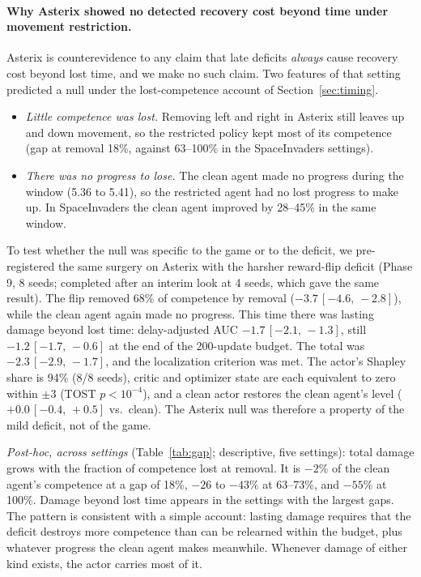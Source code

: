 \documentclass[10pt]{article} %
\newcommand{\ci}[2]{\,[#1,\,#2]}
\begin{document}
\paragraph{Why Asterix showed no detected recovery cost beyond time under movement restriction.}
Asterix is counterevidence to any claim that late deficits \emph{always} cause recovery cost beyond lost time, and we make no such claim. Two features of that setting predicted a null under the lost-competence account of Section~\ref{sec:timing}.
\begin{itemize}
\item \emph{Little competence was lost.} Removing left and right in Asterix still leaves up and down movement, so the restricted policy kept most of its competence (gap at removal 18\%, against 63--100\% in the SpaceInvaders settings).
\item \emph{There was no progress to lose.} The clean agent made no progress during the window (5.36 to 5.41), so the restricted agent had no lost progress to make up. In SpaceInvaders the clean agent improved by 28--45\% in the same window.
\end{itemize}
To test whether the null was specific to the game or to the deficit, we pre-registered the same surgery on Asterix with the harsher reward-flip deficit (Phase 9, 8 seeds; completed after an interim look at 4 seeds, which gave the same result). The flip removed 68\% of competence by removal ($-3.7\ci{-4.6}{-2.8}$), while the clean agent again made no progress. This time there was lasting damage beyond lost time: delay-adjusted AUC $-1.7\ci{-2.1}{-1.3}$, still $-1.2\ci{-1.7}{-0.6}$ at the end of the 200-update budget. The total was $-2.3\ci{-2.9}{-1.7}$, and the localization criterion was met. The actor's Shapley share is 94\% (8/8 seeds), critic and optimizer state are each equivalent to zero within $\pm3$ (TOST $p<10^{-4}$), and a clean actor restores the clean agent's level ($+0.0\ci{-0.4}{+0.5}$ vs.\ clean). The Asterix null was therefore a property of the mild deficit, not of the game.

\emph{Post-hoc, across settings} (Table~\ref{tab:gap}; descriptive, five settings): total damage grows with the fraction of competence lost at removal. It is $-2\%$ of the clean agent's competence at a gap of 18\%, $-26$ to $-43\%$ at 63--73\%, and $-55\%$ at 100\%. Damage beyond lost time appears in the settings with the largest gaps. The pattern is consistent with a simple account: lasting damage requires that the deficit destroys more competence than can be relearned within the budget, plus whatever progress the clean agent makes meanwhile. Whenever damage of either kind exists, the actor carries most of it.
\end{document}
